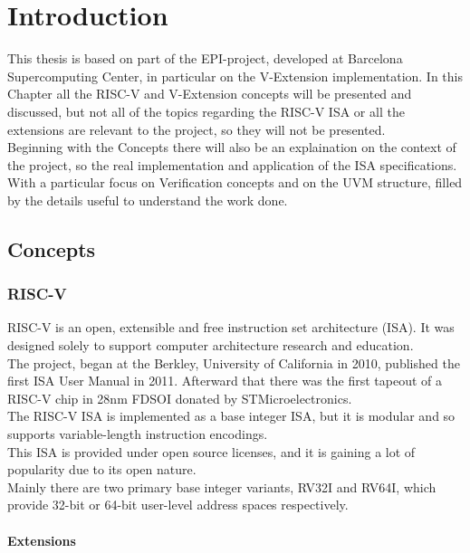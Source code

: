 \chapter{Introduction}
This thesis is based on part of the EPI-project, developed at Barcelona Supercomputing Center, in particular on the V-Extension implementation.
In this Chapter all the RISC-V and V-Extension concepts will be presented and discussed, but not all of the topics regarding the RISC-V ISA or all the extensions are relevant to the project, so they will not be presented.\\
Beginning with the Concepts there will also be an explaination on the context of the project, so the real implementation and application of the ISA specifications.
With a particular focus on Verification concepts and on the UVM structure, filled by the details useful to understand the work done.\\




\section{Concepts}
\subsection{RISC-V}
RISC-V is an open, extensible and free instruction set architecture (ISA). It was designed solely to support computer architecture research and education\cite{RISC-V-Instruction-Set-Manual}.\\
The project, began at the Berkley, University of California in 2010, published the first ISA User Manual in 2011. Afterward that there was the first tapeout of a RISC-V chip in 28nm FDSOI donated by STMicroelectronics.\\

The RISC-V ISA is implemented as a base integer ISA, but it is modular and so supports  variable-length instruction encodings.\\
This ISA is provided under open source licenses, and it is gaining a lot of popularity due to its open nature. \\
Mainly there are two primary base integer variants, RV32I and RV64I, which provide 32-bit or 64-bit user-level address spaces respectively.\\

\subsubsection{Extensions}

